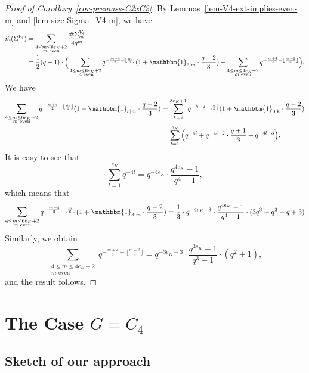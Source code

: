\documentclass[11pt]{amsart}
\theoremstyle{theorem}
\theoremstyle{example}
\theoremstyle{definition}
\numberwithin{theorem}{section}
\numberwithin{theorem}{section}
\newcommand{\m}{\widetilde{m}}
\begin{document}
\begin{proof}[Proof of Corollary~\ref{cor-premass-C2xC2}]
    By Lemmas~\ref{lem-V4-ext-implies-even-m} and \ref{lem-size-Sigma_V4-m}, we have 
    \begin{align*}
    \m(\Sigma^{V_4}) &= \sum_{\substack{4 \leq m \leq 6e_K + 2 \\ \text{$m$ even}}} \frac{\#\Sigma_m^{V_4}}{4q^m}
    \\
    &= \frac{1}{2}(q-1)\cdot\Big(\sum_{\substack{4 \leq m \leq 6e_K + 2 \\ \text{$m$ even}}} q^{-\frac{m+4}{2} - \lfloor \frac{m}{6}\rfloor}(1 + \mathbbm{1}_{3\mid m}\cdot \frac{q-2}{3}) - \sum_{\substack{4 \leq m \leq 4e_K + 2 \\ \text{$m$ even}}} q^{- \frac{m+4}{2} - \lfloor \frac{m-2}{4}\rfloor}\Big).
    \end{align*}
    We have 
    \begin{align*}
        \sum_{\substack{4 \leq m \leq 6e_K + 2 \\ \text{$m$ even}}} q^{-\frac{m+4}{2} - \lfloor \frac{m}{6}\rfloor}(1 + \mathbbm{1}_{3\mid m}\cdot \frac{q-2}{3}) &= \sum_{k=2}^{3e_K + 1} q^{-k - 2 - \lfloor \frac{k}{3}\rfloor}(1 + \mathbbm{1}_{3\mid k}\cdot \frac{q-2}{3})
        \\
        &= \sum_{l=1}^{e_K}\Big(q^{-4l} + q^{-4l - 2}\cdot \frac{q+1}{3} + q^{-4l-3}\Big).
    \end{align*}
    It is easy to see that 
    $$
    \sum_{l=1}^{e_K}q^{-4l} = q^{-4e_K}\cdot \frac{q^{4e_K} - 1}{q^4 - 1},
    $$
    which means that 
    $$
        \sum_{\substack{4 \leq m \leq 6e_K + 2 \\ \text{$m$ even}}} q^{-\frac{m+4}{2} - \lfloor \frac{m}{6}\rfloor}(1 + \mathbbm{1}_{3\mid m}\cdot \frac{q-2}{3}) = \frac{1}{3}\cdot q^{-4e_K-3}\cdot \frac{q^{4e_K} - 1}{q^4 - 1} \cdot (3q^3 + q^2 + q + 3)
    $$
    Similarly, we obtain 
    $$
    \sum_{\substack{4 \leq m \leq 4e_K + 2 \\ \text{$m$ even}}} q^{- \frac{m+4}{2} - \lfloor \frac{m-2}{4}\rfloor} = q^{-3e_K - 3}\cdot \frac{q^{3e_K} - 1}{q^3 - 1} \cdot (q^2 + 1),
    $$
    and the result follows. 
\end{proof}

\section{The Case $G = C_4$}
\label{sec-G=C4}


\subsection{Sketch of our approach}
\end{document}
